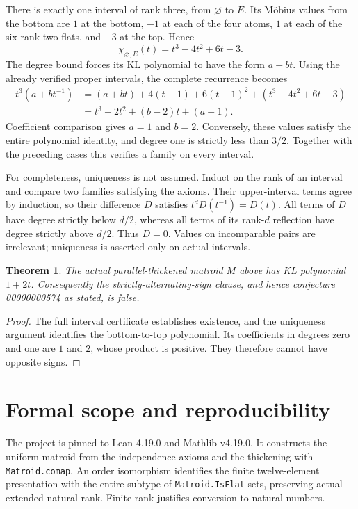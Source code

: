 \documentclass[10pt]{article}
\newtheorem{theorem}{Theorem}
\begin{document}
There is exactly one interval of rank three, from $\varnothing$ to $E$. Its M\"obius values from the bottom are $1$ at the bottom, $-1$ at each of the four atoms, $1$ at each of the six rank-two flats, and $-3$ at the top. Hence
\[
 \chi_{\varnothing,E}(t)=t^3-4t^2+6t-3.
\]
The degree bound forces its KL polynomial to have the form $a+bt$. Using the already verified proper intervals, the complete recurrence becomes
\begin{align*}
 t^3(a+bt^{-1})
 &= (a+bt)+4(t-1)+6(t-1)^2+(t^3-4t^2+6t-3)\\
 &= t^3+2t^2+(b-2)t+(a-1).
\end{align*}
Coefficient comparison gives $a=1$ and $b=2$. Conversely, these values satisfy the entire polynomial identity, and degree one is strictly less than $3/2$. Together with the preceding cases this verifies a family on every interval.

For completeness, uniqueness is not assumed. Induct on the rank of an interval and compare two families satisfying the axioms. Their upper-interval terms agree by induction, so their difference $D$ satisfies $t^dD(t^{-1})=D(t)$. All terms of $D$ have degree strictly below $d/2$, whereas all terms of its rank-$d$ reflection have degree strictly above $d/2$. Thus $D=0$. Values on incomparable pairs are irrelevant; uniqueness is asserted only on actual intervals.

\begin{theorem}
The actual parallel-thickened matroid $M$ above has KL polynomial $1+2t$. Consequently the strictly-alternating-sign clause, and hence conjecture 00000000574 as stated, is false.
\end{theorem}
\begin{proof}
The full interval certificate establishes existence, and the uniqueness argument identifies the bottom-to-top polynomial. Its coefficients in degrees zero and one are $1$ and $2$, whose product is positive. They therefore cannot have opposite signs.
\end{proof}

\newpage
\section{Formal scope and reproducibility}
The project is pinned to Lean 4.19.0 and Mathlib v4.19.0. It constructs the uniform matroid from the independence axioms and the thickening with \texttt{Matroid.comap}. An order isomorphism identifies the finite twelve-element presentation with the entire subtype of \texttt{Matroid.IsFlat} sets, preserving actual extended-natural rank. Finite rank justifies conversion to natural numbers.
\end{document}
